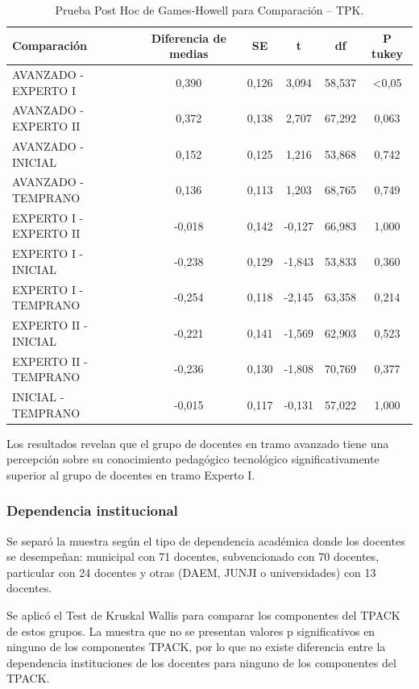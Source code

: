 \documentclass[spanish]{textolivre}
\begin{document}
\begin{table}[h!]
\centering
\begin{threeparttable}
\caption{Prueba Post Hoc de Games-Howell para Comparación – TPK.}
\label{tab04}
\centering
\begin{tabular}{l*{5}{S}}
\toprule
Comparación & {Diferencia de medias} & {SE} & {t} & {df} & {P tukey} \\
\midrule
AVANZADO - EXPERTO I  & 0,390 & 0,126 & 3,094 & 58,537 & <0,05 \\ 
AVANZADO - EXPERTO II & 0,372 & 0,138 & 2,707 & 67,292 & 0,063 \\ 
AVANZADO - INICIAL & 0,152 & 0,125 & 1,216 & 53,868 & 0,742 \\
AVANZADO - TEMPRANO & 0,136 & 0,113 & 1,203 & 68,765 & 0,749 \\
EXPERTO I - EXPERTO II & -0,018   & 0,142 & -0,127 & 66,983 & 1,000 \\ 
EXPERTO I - INICIAL & -0,238 & 0,129 & -1,843 & 53,833 & 0,360 \\ 
EXPERTO I - TEMPRANO & -0,254 & 0,118 & -2,145 & 63,358 & 0,214 \\ 
EXPERTO II - INICIAL & -0,221 & 0,141 & -1,569 & 62,903 & 0,523 \\ 
EXPERTO II - TEMPRANO & -0,236 & 0,130 & -1,808 & 70,769 & 0,377 \\ 
INICIAL - TEMPRANO & -0,015 & 0,117 & -0,131 & 57,022 & 1,000 \\ 
\bottomrule
\end{tabular}
\end{threeparttable}
\end{table}

Los resultados revelan que el grupo de docentes en tramo avanzado tiene una percepción sobre su conocimiento pedagógico tecnológico significativamente superior al grupo de docentes en tramo Experto I.

\subsubsection{Dependencia institucional}\label{sec-outras-estr}
Se separó la muestra según el tipo de dependencia académica donde los docentes se desempeñan: municipal con 71 docentes, subvencionado con 70 docentes, particular con 24 docentes y otras (DAEM, JUNJI o universidades) con 13 docentes.

Se aplicó el Test de Kruskal Wallis para comparar los componentes del TPACK de estos grupos. La  muestra que no se presentan valores p significativos en ninguno de los componentes TPACK, por lo que no existe diferencia entre la dependencia instituciones de los docentes para ninguno de los componentes del TPACK.
\end{document}
